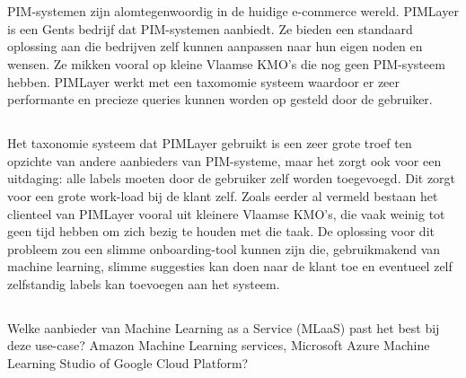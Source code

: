 
\chapter{}%
\label{ch:inleiding}

  PIM-systemen zijn alomtegenwoordig in de huidige e-commerce wereld. PIMLayer is een Gents bedrijf dat PIM-systemen aanbiedt. Ze bieden een standaard oplossing aan die bedrijven zelf kunnen aanpassen naar hun eigen noden en wensen. Ze mikken vooral op kleine Vlaamse KMO's die nog geen PIM-systeem hebben.  PIMLayer werkt met een taxomomie systeem waardoor er zeer performante en precieze queries kunnen worden op gesteld door de gebruiker. 

\section{}%
\label{sec:probleemstelling}

Het taxonomie systeem dat PIMLayer gebruikt is een zeer grote troef ten opzichte van andere aanbieders van PIM-systeme, maar het zorgt ook voor een uitdaging: alle labels moeten door de gebruiker zelf worden toegevoegd. Dit zorgt voor een grote work-load bij de klant zelf. Zoals eerder al vermeld bestaan het clienteel van PIMLayer vooral uit kleinere Vlaamse KMO's, die vaak weinig tot geen tijd hebben om zich bezig te houden met die taak.  De oplossing voor dit probleem zou een slimme onboarding-tool kunnen zijn die, gebruikmakend van machine learning, slimme suggesties kan doen naar de klant toe en eventueel zelf zelfstandig labels kan toevoegen aan het systeem.

\section{}%
\label{sec:onderzoeksvraag}

Welke aanbieder van Machine Learning as a Service (MLaaS) past het best bij deze use-case? Amazon Machine Learning services, Microsoft Azure Machine Learning Studio of Google Cloud Platform?

\section{}%
\label{sec:onderzoeksdoelstelling}

